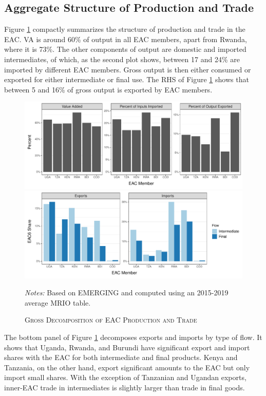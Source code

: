 \documentclass[a4paper]{article}
\begin{document}
\subsection{Aggregate Structure of Production and Trade}

Figure \ref{fig:shares_ag} compactly summarizes the structure of production and trade in the EAC. VA is around 60\% of output in all EAC members, apart from Rwanda, where it is 73\%. The other components of output are domestic and imported intermediates, of which, as the second plot shows, between 17 and 24\% are imported by different EAC members. Gross output is then either consumed or exported for either intermediate or final use. The RHS of Figure \ref{fig:shares_ag} shows that between 5 and 16\% of gross output is exported by EAC members. 

\begin{figure}[h!] 
\centering
\caption{\label{fig:shares_ag}\textsc{Gross Decomposition of EAC Production and Trade}}
\vspace{2mm}
\includegraphics[width=1\textwidth, trim= {0 1cm 0 0}, clip]{"Figures/EM_gross_shares_ag.pdf"} \includegraphics[width=1\textwidth, trim= {0 0 0 0}, clip]{"Figures/EM_gross_trade_shares_ag.pdf"} \\
\raggedright
\scriptsize
\emph{Notes:} Based on EMERGING and computed using an 2015-2019 average MRIO table. 
\end{figure}
\FloatBarrier

The bottom panel of Figure \ref{fig:shares_ag} decomposes exports and imports by type of flow. It shows that Uganda, Rwanda, and Burundi have significant export and import shares with the EAC for both intermediate and final products. Kenya and Tanzania, on the other hand, export significant amounts to the EAC but only import small shares. With the exception of Tanzanian and Ugandan exports, inner-EAC trade in intermediates is slightly larger than trade in final goods. 
\end{document}
